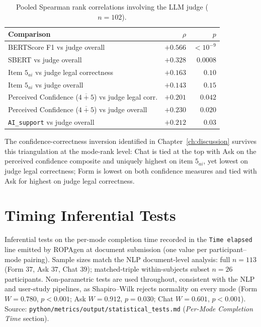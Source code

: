 \begin{table}[H]
\centering
\caption{Pooled Spearman rank correlations involving the LLM
judge ($n = 102$).}
\label{tab:app-corr-judge-pooled}
\small
\begin{tabular}{@{}l r r@{}}
\toprule
Comparison & $\rho$ & $p$ \\
\midrule
BERTScore F1 vs judge overall            & $+0.566$ & $< 10^{-9}$ \\
SBERT vs judge overall                   & $+0.328$ & $0.0008$ \\
Item $5_{ai}$ vs judge legal correctness                       & $+0.163$ & $0.10$ \\
Item $5_{ai}$ vs judge overall                                 & $+0.143$ & $0.15$ \\
Perceived Confidence ($\overline{4{+}5}$) vs judge legal corr. & $+0.201$ & $0.042$ \\
Perceived Confidence ($\overline{4{+}5}$) vs judge overall     & $+0.230$ & $0.020$ \\
\texttt{AI\_support} vs judge overall                          & $+0.212$ & $0.03$ \\
\bottomrule
\end{tabular}
\end{table}

The confidence-correctness inversion identified in
Chapter~\ref{ch:discussion} survives this triangulation at the
mode-rank level: Chat is tied at the top with Ask on the perceived
confidence composite and uniquely highest on item $5_{ai}$, yet
lowest on judge legal correctness; Form is lowest on both
confidence measures and tied with Ask for highest on judge legal
correctness.

\section{Timing Inferential Tests}
\label{app:inf-timing}

Inferential tests on the per-mode completion time recorded in the
\texttt{Time elapsed} line emitted by ROPAgen at document submission
(one value per participant--mode pairing). Sample sizes match the NLP
document-level analysis: full $n = 113$ (Form $37$, Ask $37$, Chat
$39$); matched-triple within-subjects subset $n = 26$ participants.
Non-parametric tests are used throughout, consistent with the NLP and
user-study pipelines, as Shapiro--Wilk rejects normality on every
mode (Form $W = 0.780$, $p < 0.001$; Ask $W = 0.912$, $p = 0.030$;
Chat $W = 0.601$, $p < 0.001$). Source:
\texttt{python/\allowbreak{}metrics/\allowbreak{}output/\allowbreak{}statistical\_tests.md}
(\emph{Per-Mode Completion Time} section).

